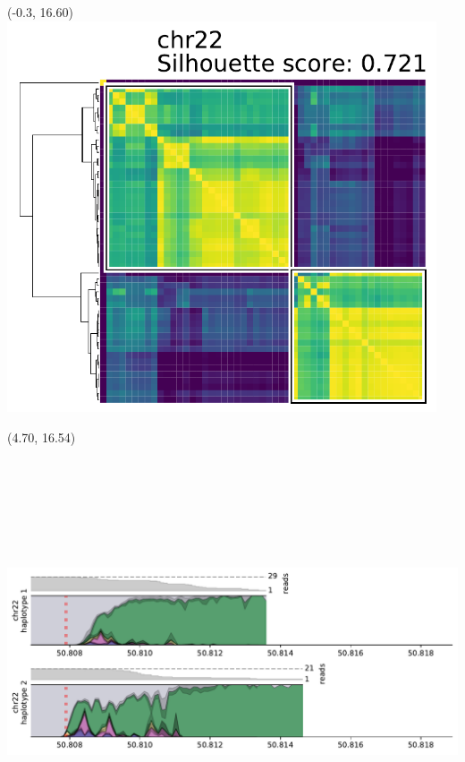 \documentclass{article}
\begin{document}
\begin{textblock}{13}(-0.3, 16.60) \includegraphics[width=5in]{assets/HG002-q_arm-levenshtein-clustermaps/chr22.pdf}   \end{textblock}
\begin{textblock}{13}(4.70, 16.54) \includegraphics[height=5in]{assets/HG002-q_arm-levenshtein-densityplots/chr22.pdf} \end{textblock}
\end{document}
